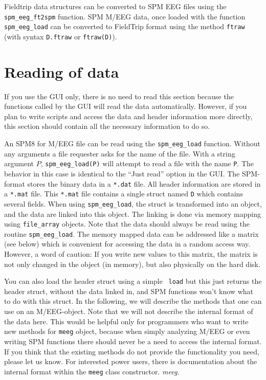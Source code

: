 Fieldtrip data structures can be converted to SPM EEG files using the \texttt{spm\_eeg\_ft2spm} function. SPM M/EEG data, once loaded with the function \texttt{spm\_eeg\_load} can be converted to FieldTrip format using the method \texttt{ftraw} (with syntax \texttt{D.ftraw} or \texttt{ftraw(D)}).

\section{Reading of data\label{sec:load}}
If you use the GUI only, there is no need to read this section because the functions called by the GUI will read the data automatically. However, if you plan to write scripts and access the data and header information more directly, this section should contain all the necessary information to do so.

An SPM8 for M/EEG file can be read using the \texttt{spm\_eeg\_load} function. Without any arguments a file requester asks for the name of the file. With a string argument $P$, \texttt{spm\_eeg\_load(P)} will attempt to read a file with the name \texttt{P}. The behavior in this case is identical to the ``Just read'' option in the GUI. The SPM-format stores the binary data in a \texttt{*.dat} file. All header information are stored in a \texttt{*.mat} file. This \texttt{*.mat} file contains a single struct named \texttt{D} which contains several fields. When using \texttt{spm\_eeg\_load}, the struct is transformed into an object, and the data are linked into this object. The linking is done via memory mapping using \texttt{file\_array} objects. Note that the data should always be read using the routine \texttt{spm\_eeg\_load}. The memory mapped data can be addressed like a matrix (see below) which is convenient for accessing the data in a random access way. However, a word of caution: If you write new values to this matrix, the matrix is not only changed in the object (in memory), but also physically on the hard disk.

You can also load the header struct using a simple \matlab\ \texttt{load} but this just returns the header struct, without the data linked in, and SPM functions won't know what to do with this struct. In the following, we will describe the methods that one can use on an M/EEG-object. Note that we will not describe the internal format of the data here. This would be helpful only for programmers who want to write new methods for \texttt{meeg} object, because when simply analyzing M/EEG or even writing SPM functions there should never be a need to access the internal format. If you think that the existing methods do not provide the functionality you need, please let us know. For interested power users, there is documentation about the internal format within the \texttt{meeg} class constructor.
\textit{meeg}.


